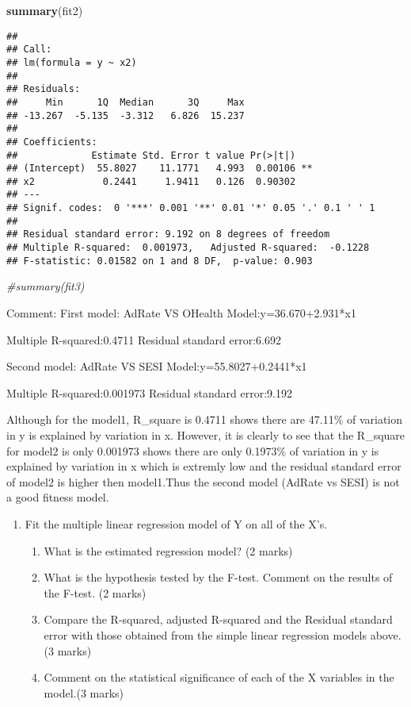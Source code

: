 \documentclass[11pt,]{article}
\newenvironment{Shaded}{\begin{snugshade}}{\end{snugshade}}
\newcommand{\KeywordTok}[1]{\textcolor[rgb]{0.13,0.29,0.53}{\textbf{#1}}}
\newcommand{\CommentTok}[1]{\textcolor[rgb]{0.56,0.35,0.01}{\textit{#1}}}
\newcommand{\NormalTok}[1]{#1}
\providecommand{\tightlist}{%
  \setlength{\itemsep}{0pt}\setlength{\parskip}{0pt}}
\begin{document}
\begin{Shaded}
\begin{Highlighting}[]
\KeywordTok{summary}\NormalTok{(fit2)}
\end{Highlighting}
\end{Shaded}

\begin{verbatim}
## 
## Call:
## lm(formula = y ~ x2)
## 
## Residuals:
##     Min      1Q  Median      3Q     Max 
## -13.267  -5.135  -3.312   6.826  15.237 
## 
## Coefficients:
##             Estimate Std. Error t value Pr(>|t|)   
## (Intercept)  55.8027    11.1771   4.993  0.00106 **
## x2            0.2441     1.9411   0.126  0.90302   
## ---
## Signif. codes:  0 '***' 0.001 '**' 0.01 '*' 0.05 '.' 0.1 ' ' 1
## 
## Residual standard error: 9.192 on 8 degrees of freedom
## Multiple R-squared:  0.001973,   Adjusted R-squared:  -0.1228 
## F-statistic: 0.01582 on 1 and 8 DF,  p-value: 0.903
\end{verbatim}

\begin{Shaded}
\begin{Highlighting}[]
\CommentTok{#summary(fit3)}
\end{Highlighting}
\end{Shaded}

Comment: First model: AdRate VS OHealth Model:y=36.670+2.931*x1

Multiple R-squared:0.4711 Residual standard error:6.692

Second model: AdRate VS SESI Model:y=55.8027+0.2441*x1

Multiple R-squared:0.001973 Residual standard error:9.192

Although for the model1, R\_square is 0.4711 shows there are 47.11\% of
variation in y is explained by variation in x. However, it is clearly to
see that the R\_square for model2 is only 0.001973 shows there are only
0.1973\% of variation in y is explained by variation in x which is
extremly low and the residual standard error of model2 is higher then
model1.Thus the second model (AdRate vs SESI) is not a good fitness
model.

\begin{enumerate}
\def\labelenumi{\arabic{enumi}.}
\setcounter{enumi}{3}
\tightlist
\item
  Fit the multiple linear regression model of Y on all of the X's.

  \begin{enumerate}
  \def\labelenumii{\alph{enumii}.}
  \tightlist
  \item
    What is the estimated regression model? (2 marks)
  \item
    What is the hypothesis tested by the F-test. Comment on the results
    of the F-test. (2 marks)
  \item
    Compare the R-squared, adjusted R-squared and the Residual standard
    error with those obtained from the simple linear regression models
    above. (3 marks)
  \item
    Comment on the statistical significance of each of the X variables
    in the model.(3 marks)
  \end{enumerate}
\end{enumerate}
\end{document}
